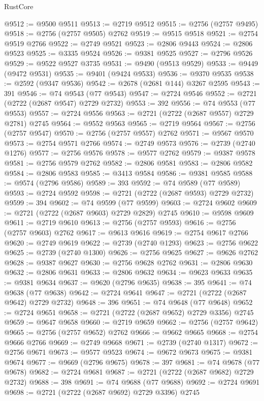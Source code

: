 \begin{lexlean}{RustCore}
\begin{coremodule}
@9512 := @9500 @9511
@9513 := @2719 @9512
@9515 := @2756 (@2757 @9495)
@9518 := @2756 (@2757 @9505) @2762
@9519 := @9515 @9518
@9521 := @2754 @9519 @2766
@9522 := @2749 @9521
@9523 := @2806 @9443
@9524 := @2806 @9523
@9525 := @3335 @9524
@9526 := @9381 @9525
@9527 := @2796 @9526
@9529 := @9522 @9527 @3735
@9531 := @9490 (@9513 @9529)
@9533 := @9449 (@9472 @9531)
@9535 := @9401 (@9424 @9533)
@9536 := @9370 @9535
@9538 := @2592 (@9347 @9536)
@9542 := @2678 (@2681 @144) @3267 @2595
@9543 := 391
@9546 := @74 @9543 (@77 @9543)
@9547 := @2724 @9546
@9552 := @2721 (@2722 (@2687 @9547) @2729 @2732)
@9553 := 392
@9556 := @74 @9553 (@77 @9553)
@9557 := @2724 @9556
@9563 := @2721 (@2722 (@2687 @9557) @2729 @2781) @2745
@9564 := @9552 @9563
@9565 := @2719 @9564
@9567 := @2756 (@2757 @9547)
@9570 := @2756 (@2757 @9557) @2762
@9571 := @9567 @9570
@9573 := @2754 @9571 @2766
@9574 := @2749 @9573
@9576 := @2739 (@2740 @1276)
@9577 := @2756 @9576
@9578 := @9577 @2762
@9579 := @9387 @9578
@9581 := @2756 @9579 @2762
@9582 := @2806 @9581
@9583 := @2806 @9582
@9584 := @2806 @9583
@9585 := @3413 @9584
@9586 := @9381 @9585
@9588 := @9574 (@2796 @9586)
@9589 := 393
@9592 := @74 @9589 (@77 @9589)
@9593 := @2724 @9592
@9598 := @2721 (@2722 (@2687 @9593) @2729 @2732)
@9599 := 394
@9602 := @74 @9599 (@77 @9599)
@9603 := @2724 @9602
@9609 := @2721 (@2722 (@2687 @9603) @2729 @2829) @2745
@9610 := @9598 @9609
@9611 := @2719 @9610
@9613 := @2756 (@2757 @9593)
@9616 := @2756 (@2757 @9603) @2762
@9617 := @9613 @9616
@9619 := @2754 @9617 @2766
@9620 := @2749 @9619
@9622 := @2739 (@2740 @1293)
@9623 := @2756 @9622
@9625 := @2739 (@2740 @1300)
@9626 := @2756 @9625
@9627 := @9626 @2762
@9628 := @9387 @9627
@9630 := @2756 @9628 @2762
@9631 := @2806 @9630
@9632 := @2806 @9631
@9633 := @2806 @9632
@9634 := @9623 @9633
@9635 := @9381 @9634
@9637 := @9620 (@2796 @9635)
@9638 := 395
@9641 := @74 @9638 (@77 @9638)
@9642 := @2724 @9641
@9647 := @2721 (@2722 (@2687 @9642) @2729 @2732)
@9648 := 396
@9651 := @74 @9648 (@77 @9648)
@9652 := @2724 @9651
@9658 := @2721 (@2722 (@2687 @9652) @2729 @3356) @2745
@9659 := @9647 @9658
@9660 := @2719 @9659
@9662 := @2756 (@2757 @9642)
@9665 := @2756 (@2757 @9652) @2762
@9666 := @9662 @9665
@9668 := @2754 @9666 @2766
@9669 := @2749 @9668
@9671 := @2739 (@2740 @1317)
@9672 := @2756 @9671
@9673 := @9577 @9523
@9674 := @9672 @9673
@9675 := @9381 @9674
@9677 := @9669 (@2796 @9675)
@9678 := 397
@9681 := @74 @9678 (@77 @9678)
@9682 := @2724 @9681
@9687 := @2721 (@2722 (@2687 @9682) @2729 @2732)
@9688 := 398
@9691 := @74 @9688 (@77 @9688)
@9692 := @2724 @9691
@9698 := @2721 (@2722 (@2687 @9692) @2729 @3396) @2745

\end{coremodule}
\end{lexlean}
